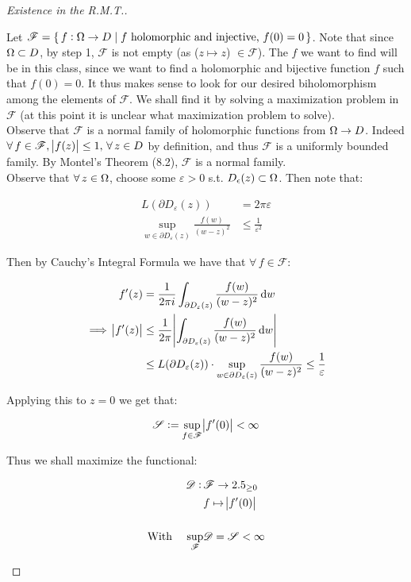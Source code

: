 \begin{proof}[Existence in the R.M.T.]
\begin{enumerate}
Let $\mathscr{F} = \set{ f: \Omega\to D \mid f \text{ holomorphic and injective, } f(0) = 0}$. Note that since $\Omega \subset D$, by step 1, $\mathscr{F}$ is not empty (as ($z\mapsto z$) $\in \mathscr{F}$). The $f$ we want to find will be in this class, since we want to find a holomorphic and bijective function $f$ such that $f(0) = 0$. It thus makes sense to look for our desired biholomorphism among the elements of $\mathscr{F}$. We shall find it by solving a maximization problem in $\mathscr{F}$ (at this point it is unclear what maximization problem to solve).\\

Observe that $\mathscr{F}$ is a normal family of holomorphic functions from $\Omega \to D$. Indeed $\forall \, f \in \mathscr{F}, \, \abs{f(z) } \leq 1, \, \forall \, z \in D$ by definition, and thus $\mathscr{F}$ is a uniformly bounded family. By Montel's Theorem (8.2), $\mathscr{F}$ is a normal family.\\

Observe that $\forall \, z \in \Omega$, choose some $\varepsilon > 0$ s.t. $D_\epsilon(z) \subset \Omega$. Then note that:

\begin{align*}
    L(\partial D_\varepsilon (z)) &= 2 \pi \varepsilon\\
    \sup_{w \in \partial D_\varepsilon (z)} \frac{f(w)}{(w-z)^2} &\leq \frac{1}{\varepsilon^2}
\end{align*}

Then by Cauchy's Integral Formula we have that $\forall \, f \in \mathscr{F}$:

\begin{align*}
    f'(z) &= \frac{1}{2 \pi i} \int_{\partial D_\varepsilon (z)} \frac{f(w)}{(w-z)^2} \dif w\\
\implies \abs{f'(z)} &\leq \frac{1}{2 \pi} \abs{\int_{\partial D_\varepsilon (z)} \frac{f(w)}{(w-z)^2} \dif w}\\
&\leq L(\partial D_\varepsilon (z)) \cdot \sup_{w \in \partial D_\varepsilon (z)} \frac{f(w)}{(w-z)^2} \leq \frac{1}{\varepsilon}
\end{align*}


Applying this to $z=0$ we get that:

\begin{align*}
    \mathscr{S} \vcentcolon = \sup_{f \in \mathscr{F}} \abs{f'(0)} < \infty
\end{align*}

Thus we shall maximize the functional:

\begin{align*}
    \mathscr{D} : \, &\mathscr{F} \to 2.5_{\geq 0}\\
    &f \mapsto \abs{f'(0)}\\\\
    \text{With }\; \; \; \sup_{\mathscr{F}} & \mathscr{D} = \mathscr{S} < \infty
\end{align*}


\end{enumerate}
\end{proof}
